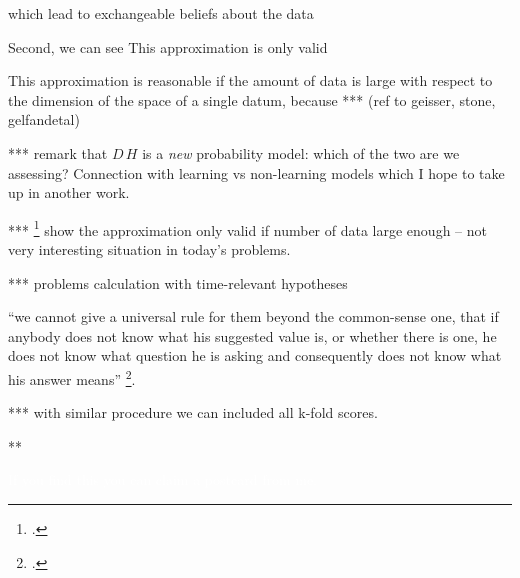 \documentclass[\ifafour a4paper,12pt,\else a5paper,10pt,\fi%
onecolumn,oneside,article,%
british%
]{memoir}
\theoremstyle{remark}
\theoremstyle{innote}
\newcommand*{\citep}{\footcites}
\renewcommand*{\|}[1][]{\nonscript\,#1\vert\nonscript\;\mathopen{}}
\newcommand*{\sect}{\S}%
\begin{document}
which lead to
exchangeable beliefs about the data

Second, we can see 
This approximation is only valid

This approximation is reasonable if the amount of data is large with
respect to the dimension of the space of a single datum, because *** (ref
to geisser, stone, gelfandetal)

*** remark that $D\,H$ is a \emph{new} probability model: which of the two
are we assessing? Connection with learning vs non-learning models which I
hope to take up in another work.

***  \citep[\sect~6.1.6]{bernardoetal1994} show the approximation only
valid if number of data large enough -- not very interesting situation in
today's problems.


*** problems calculation with time-relevant hypotheses


\enquote{we cannot give a universal rule for them beyond the common-sense one, that if anybody does not know what his suggested value is, or whether there is one, he does not know what question he is asking and consequently does not know what his answer means} \citep[\sect~3.1 p.~124 ]{jeffreys1939_r1983}.


*** with similar procedure we can included all k-fold scores.


**



\textcolor{white}{If you find this you can claim a postcard from me.}







\end{document}
